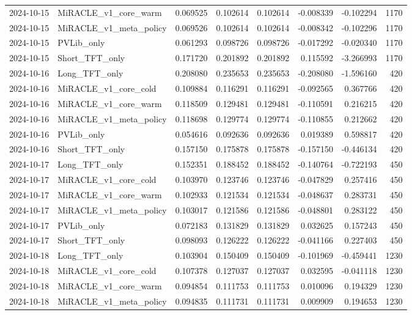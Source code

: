 \begin{tabular}{llrrrrrr}
2024-10-15 & MiRACLE_v1_core_warm & 0.069525 & 0.102614 & 0.102614 & -0.008339 & -0.102294 & 1170 \\
2024-10-15 & MiRACLE_v1_meta_policy & 0.069526 & 0.102614 & 0.102614 & -0.008342 & -0.102296 & 1170 \\
2024-10-15 & PVLib_only & 0.061293 & 0.098726 & 0.098726 & -0.017292 & -0.020340 & 1170 \\
2024-10-15 & Short_TFT_only & 0.171720 & 0.201892 & 0.201892 & 0.115592 & -3.266993 & 1170 \\
2024-10-16 & Long_TFT_only & 0.208080 & 0.235653 & 0.235653 & -0.208080 & -1.596160 & 420 \\
2024-10-16 & MiRACLE_v1_core_cold & 0.109884 & 0.116291 & 0.116291 & -0.092565 & 0.367766 & 420 \\
2024-10-16 & MiRACLE_v1_core_warm & 0.118509 & 0.129481 & 0.129481 & -0.110591 & 0.216215 & 420 \\
2024-10-16 & MiRACLE_v1_meta_policy & 0.118698 & 0.129774 & 0.129774 & -0.110855 & 0.212662 & 420 \\
2024-10-16 & PVLib_only & 0.054616 & 0.092636 & 0.092636 & 0.019389 & 0.598817 & 420 \\
2024-10-16 & Short_TFT_only & 0.157150 & 0.175878 & 0.175878 & -0.157150 & -0.446134 & 420 \\
2024-10-17 & Long_TFT_only & 0.152351 & 0.188452 & 0.188452 & -0.140764 & -0.722193 & 450 \\
2024-10-17 & MiRACLE_v1_core_cold & 0.103970 & 0.123746 & 0.123746 & -0.047829 & 0.257416 & 450 \\
2024-10-17 & MiRACLE_v1_core_warm & 0.102933 & 0.121534 & 0.121534 & -0.048637 & 0.283731 & 450 \\
2024-10-17 & MiRACLE_v1_meta_policy & 0.103017 & 0.121586 & 0.121586 & -0.048801 & 0.283122 & 450 \\
2024-10-17 & PVLib_only & 0.072183 & 0.131829 & 0.131829 & 0.032625 & 0.157243 & 450 \\
2024-10-17 & Short_TFT_only & 0.098093 & 0.126222 & 0.126222 & -0.041166 & 0.227403 & 450 \\
2024-10-18 & Long_TFT_only & 0.103904 & 0.150409 & 0.150409 & -0.101969 & -0.459441 & 1230 \\
2024-10-18 & MiRACLE_v1_core_cold & 0.107378 & 0.127037 & 0.127037 & 0.032595 & -0.041118 & 1230 \\
2024-10-18 & MiRACLE_v1_core_warm & 0.094854 & 0.111753 & 0.111753 & 0.010096 & 0.194329 & 1230 \\
2024-10-18 & MiRACLE_v1_meta_policy & 0.094835 & 0.111731 & 0.111731 & 0.009909 & 0.194653 & 1230 \\

\end{tabular}
